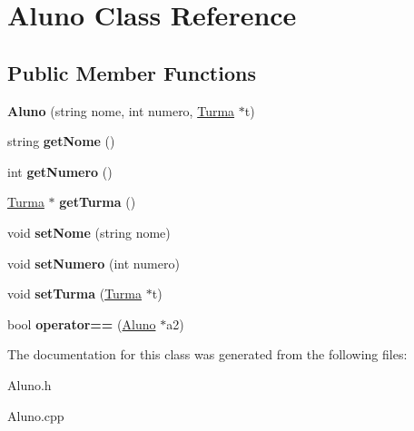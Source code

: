 \hypertarget{class_aluno}{\section{Aluno Class Reference}
\label{class_aluno}
}
\subsection*{Public Member Functions}
\begin{DoxyCompactItemize}
\item 
\hypertarget{class_aluno_ade694c179acf4d2c82abec8ee44d1793}{{\bfseries Aluno} (string nome, int numero, \hyperlink{class_turma}{Turma} $\ast$t)}\label{class_aluno_ade694c179acf4d2c82abec8ee44d1793}

\item 
\hypertarget{class_aluno_a75ca576e335d4678e6777de92a218b99}{string {\bfseries get\-Nome} ()}\label{class_aluno_a75ca576e335d4678e6777de92a218b99}

\item 
\hypertarget{class_aluno_a258e8f5c3dbc8b19efadaf20ba48874f}{int {\bfseries get\-Numero} ()}\label{class_aluno_a258e8f5c3dbc8b19efadaf20ba48874f}

\item 
\hypertarget{class_aluno_a1f3d823c2589d39d930738689707ba3d}{\hyperlink{class_turma}{Turma} $\ast$ {\bfseries get\-Turma} ()}\label{class_aluno_a1f3d823c2589d39d930738689707ba3d}

\item 
\hypertarget{class_aluno_a317539f87c1d2cd5d0228eef9b42bd14}{void {\bfseries set\-Nome} (string nome)}\label{class_aluno_a317539f87c1d2cd5d0228eef9b42bd14}

\item 
\hypertarget{class_aluno_a36ad83483a9e0c247d7092a95607758c}{void {\bfseries set\-Numero} (int numero)}\label{class_aluno_a36ad83483a9e0c247d7092a95607758c}

\item 
\hypertarget{class_aluno_a5403cd3d2d1a219f9aa49bc53825d4fc}{void {\bfseries set\-Turma} (\hyperlink{class_turma}{Turma} $\ast$t)}\label{class_aluno_a5403cd3d2d1a219f9aa49bc53825d4fc}

\item 
\hypertarget{class_aluno_a70c5a814dcd56edc12bbe2c00aa3a7a6}{bool {\bfseries operator==} (\hyperlink{class_aluno}{Aluno} $\ast$a2)}\label{class_aluno_a70c5a814dcd56edc12bbe2c00aa3a7a6}

\end{DoxyCompactItemize}


The documentation for this class was generated from the following files\-:\begin{DoxyCompactItemize}
\item 
Aluno.\-h\item 
Aluno.\-cpp\end{DoxyCompactItemize}
